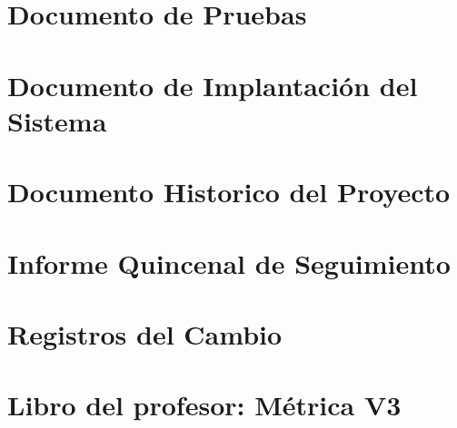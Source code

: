 \documentclass[12pt, twoside, openright]{report} %
\begin{document}
\part{Documento de Pruebas}



\part{Documento de Implantación del Sistema}



\part{Documento Historico del Proyecto}



\part{Informe Quincenal de Seguimiento}







\part{Registros del Cambio}




\part{Libro del profesor: Métrica V3}

\end{document}
